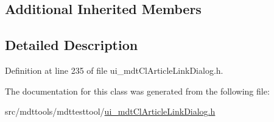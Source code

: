 \subsection*{Additional Inherited Members}


\subsection{Detailed Description}


Definition at line 235 of file ui\-\_\-mdt\-Cl\-Article\-Link\-Dialog.\-h.



The documentation for this class was generated from the following file\-:\begin{DoxyCompactItemize}
\item 
src/mdttools/mdttesttool/\hyperlink{ui__mdt_cl_article_link_dialog_8h}{ui\-\_\-mdt\-Cl\-Article\-Link\-Dialog.\-h}\end{DoxyCompactItemize}
